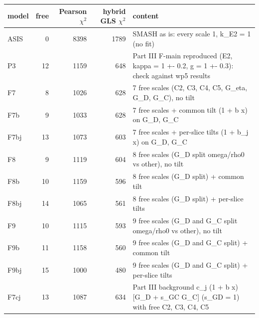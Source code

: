 \begin{tabular}{lrrrl}
\toprule
model & free & Pearson $\chi^2$ & hybrid GLS $\chi^2$ & content \\
\midrule
ASIS & 0 & 8398 & 1789 & SMASH as is: every scale 1, k\_E2 = 1 (no fit) \\
P3 & 12 & 1159 & 648 & Part III F-main reproduced (E2, kappa = 1 +- 0.2, g = 1 +- 0.3): check against wp5 results \\
F7 & 8 & 1026 & 628 & 7 free scales (C2, C3, C4, C5, G\_eta, G\_D, G\_C), no tilt \\
F7b & 9 & 1033 & 628 & 7 free scales + common tilt (1 + b x) on G\_D, G\_C \\
F7bj & 13 & 1073 & 603 & 7 free scales + per-slice tilts (1 + b\_j x) on G\_D, G\_C \\
F8 & 9 & 1119 & 604 & 8 free scales (G\_D split omega/rho0 vs other), no tilt \\
F8b & 10 & 1159 & 596 & 8 free scales (G\_D split) + common tilt \\
F8bj & 14 & 1065 & 561 & 8 free scales (G\_D split) + per-slice tilts \\
F9 & 10 & 1115 & 593 & 9 free scales (G\_D and G\_C split omega/rho0 vs other), no tilt \\
F9b & 11 & 1158 & 560 & 9 free scales (G\_D and G\_C split) + common tilt \\
F9bj & 15 & 1000 & 480 & 9 free scales (G\_D and G\_C split) + per-slice tilts \\
F7cj & 13 & 1087 & 634 & Part III background c\_j (1 + b x)[G\_D + s\_GC G\_C] (s\_GD = 1) with free C2, C3, C4, C5 \\
\bottomrule
\end{tabular}
